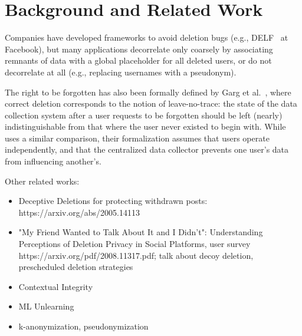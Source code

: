 \section{Background and Related Work}

Companies have developed frameworks to avoid deletion bugs (e.g., DELF~\cite{delf} at Facebook), but many
applications decorrelate only coarsely by associating remnants of data with a global placeholder for
all deleted users, or do not decorrelate at all (e.g., replacing usernames with a pseudonym).


The right to be forgotten has also been formally defined by Garg et
al.~\cite{garg}, where correct deletion corresponds to the notion of
leave-no-trace: the state of the data collection system after a user requests to be forgotten should
be left (nearly) indistinguishable from that where the user never existed to begin with. While
\sys{} uses a similar comparison, their formalization assumes that users operate
independently, and that the centralized data collector prevents one user's data from influencing
another's.

Other related works:
\begin{itemize}
    \item Deceptive Deletions for protecting withdrawn posts: https://arxiv.org/abs/2005.14113
    \item "My Friend Wanted to Talk About It and I Didn't": Understanding Perceptions of
        Deletion Privacy in Social Platforms, user survey https://arxiv.org/pdf/2008.11317.pdf;
        talk about decoy deletion, prescheduled deletion strategies~\cite{myfw}
    \item Contextual Integrity
    \item ML Unlearning
    \item k-anonymization, pseudonymization
\end{itemize}

